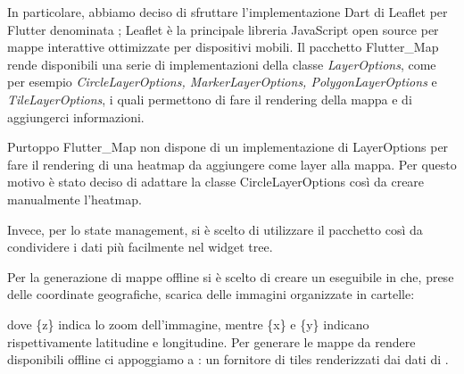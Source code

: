 \documentclass[a4paper]{article}
\begin{document}
In particolare, abbiamo deciso di sfruttare l'implementazione Dart di Leaflet per Flutter denominata \cite{FlutterMap}; Leaflet è la principale libreria JavaScript open source per mappe interattive ottimizzate per dispositivi mobili. Il pacchetto Flutter\_Map rende disponibili una serie di implementazioni della classe \textit{LayerOptions}, come per esempio \textit{CircleLayerOptions, MarkerLayerOptions, PolygonLayerOptions} e \textit{TileLayerOptions}, i quali permettono di fare il rendering della mappa e di aggiungerci informazioni. 

Purtoppo Flutter\_Map non dispone di un implementazione di LayerOptions per fare il rendering di una heatmap da aggiungere come layer alla mappa. Per questo motivo è stato deciso di adattare la classe CircleLayerOptions così da creare manualmente l'heatmap.

Invece, per lo state management, si è scelto di utilizzare il pacchetto \cite{Provider} così da condividere i dati più facilmente nel widget tree. 
 
Per la generazione di mappe offline si è scelto di creare un eseguibile in \cite{Rust} che, prese delle coordinate geografiche, scarica delle immagini organizzate in cartelle:
\begin{center}
    {\setnewpathsep{/} }
\end{center}
dove \{z\} indica lo zoom dell'immagine, mentre \{x\} e \{y\} indicano rispettivamente latitudine e longitudine.
Per generare le mappe da rendere disponibili offline ci appoggiamo a \cite{Thunderforest}: un fornitore di tiles renderizzati dai dati di \cite{OpenStreetMap}.

\end{document}

